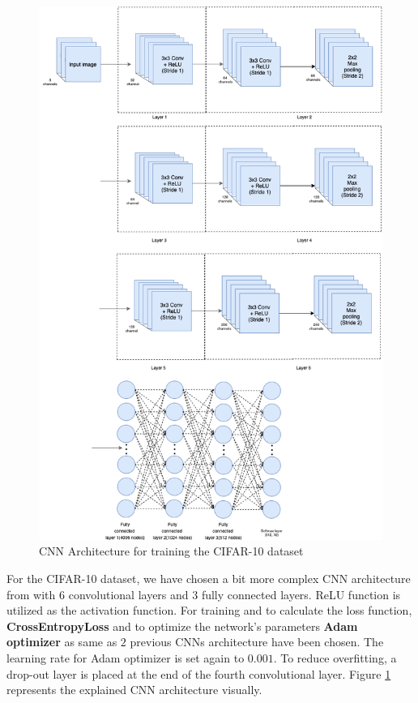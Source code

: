 \begin{figure}
  \centering
  \label{fig:CIFAR_CNN_Architecture}
  \includegraphics[width=1\textwidth]{fig/CIFAR-CNN-Architecture}
  \caption{CNN Architecture for training the CIFAR-10 dataset}
\end{figure}

For the CIFAR-10 dataset, we have chosen a bit more complex CNN architecture from \cite{CIFAR_CNN_Architecture} with $6$
convolutional layers and $3$ fully connected layers. ReLU function is utilized as the activation
function. For training and to calculate the loss function, \textbf{CrossEntropyLoss} and
to optimize the network's parameters \textbf{Adam optimizer} as same as $2$ previous CNNs architecture have been
chosen. The learning rate for Adam optimizer is set again to $0.001$. To reduce overfitting, a
drop-out layer is placed at the end of the fourth convolutional layer. Figure \ref{fig:CIFAR_CNN_Architecture} represents the explained CNN architecture visually. 



